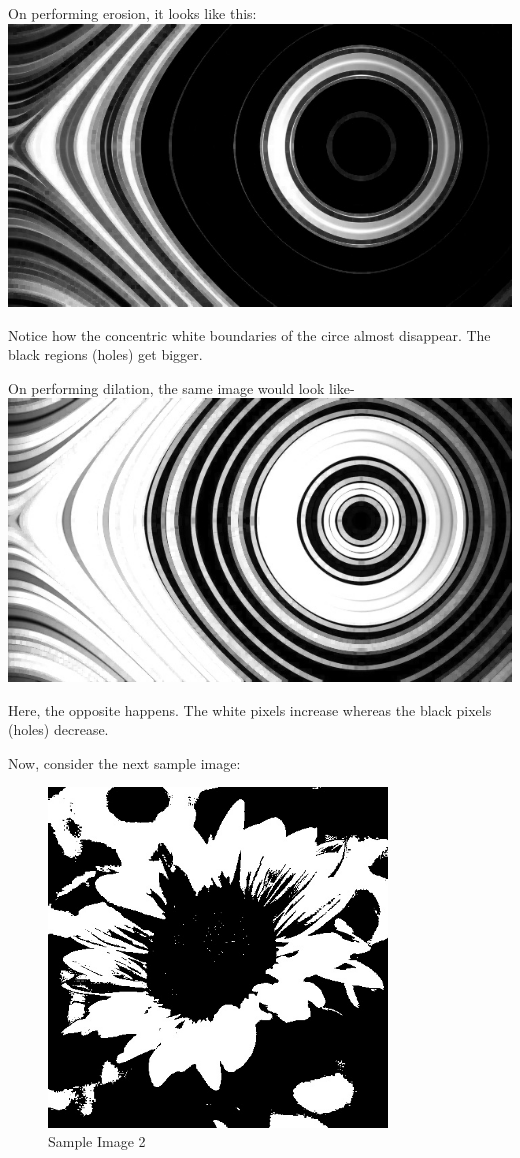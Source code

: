 \documentclass[]{article}
\begin{document}
On performing erosion, it looks like this:\\
\includegraphics{images/Morphological Operations/Images/Eroded.jpg}

Notice how the concentric white boundaries of the circe almost
disappear. The black regions (holes) get bigger.

On performing dilation, the same image would look like-\\
\includegraphics{images/Morphological Operations/Images/Dilated.jpg}

Here, the opposite happens. The white pixels increase whereas the black
pixels (holes) decrease.

Now, consider the next sample image:

\begin{figure}[htbp]
\centering
\includegraphics[width=9cm]{images/Morphological Operations/Images/Sunflower.jpg}
\caption{Sample Image 2}
\end{figure}
\end{document}
